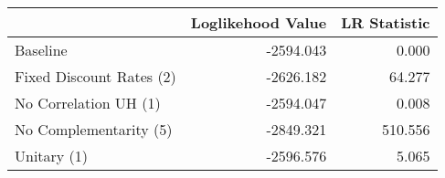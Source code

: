 \begin{tabular}{lrr}
\toprule
{} & Loglikehood Value & LR Statistic \\
\midrule
Baseline                 &         -2594.043 &        0.000 \\
Fixed Discount Rates (2) &         -2626.182 &       64.277 \\
No Correlation UH (1)    &         -2594.047 &        0.008 \\
No Complementarity (5)   &         -2849.321 &      510.556 \\
Unitary (1)              &         -2596.576 &        5.065 \\
\bottomrule
\end{tabular}
